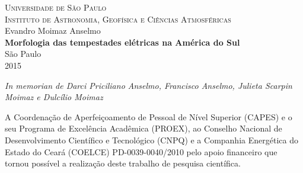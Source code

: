 \documentclass[12pt,a4paper,tocpage=plain,floatnumber=continuous,chapter=TITLE,appendix=nobox,font=plain, header=ruled,hyperindex=false]{abnt}
\author{Evandro Moimaz Anselmo}
\begin{document}
\begin{titlepage}
    \begin{center}
        {\textsc{Universidade de São Paulo}}\\
        {\textsc{Instituto de Astronomia, Geofísica e Ciências Atmosféricas}} \\ [3.5cm]
        {\large Evandro Moimaz Anselmo} \\[4.9cm]
        {\LARGE \textbf{Morfologia das tempestades elétricas na América do Sul}} \\[4.9cm]
        \vfill
        {São Paulo} \\
        {2015}
    \end{center}
\end{titlepage}




{}

\folhaderosto
\begin{folhadeaprovacao}

\end{folhadeaprovacao}

\pretextualchapter{}
\vfill
\begin{flushright}
\textit{\large In memorian de Darci Priciliano Anselmo, Francisco Anselmo, Julieta Scarpin Moimaz e Dulcílio Moimaz}
\end{flushright}


A Coordenação de Aperfeiçoamento de Pessoal de Nível Superior (CAPES) e o seu Programa de Excelência Acadêmica (PROEX), ao Conselho Nacional de Desenvolvimento Científico e Tecnológico (CNPQ) e a Companhia Energética do Estado do Ceará (COELCE) PD-0039-0040/2010 pelo apoio financeiro que tornou possível a realização deste trabalho de pesquisa científica.
\end{document}
